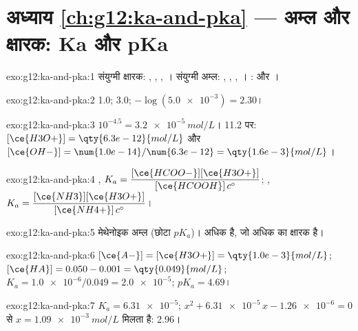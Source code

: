 \section*{अध्याय \ref{ch:g12:ka-and-pka} --- अम्ल और क्षारक: Ka और pKa}

\begin{solution}{exo:g12:ka-and-pka:1}
संयुग्मी क्षारक: , , , । संयुग्मी
अम्ल: , , , । : 
और ।
\end{solution}

\begin{solution}{exo:g12:ka-and-pka:2}
 1.0; 3.0; $-\log(\num{5.0e-3}) = 2.30$।
\end{solution}

\begin{solution}{exo:g12:ka-and-pka:3}
$10^{-4.5} = \qty{3.2e-5}{mol/L}$।  11.2 पर:
$[\ce{H3O+}] = \qty{6.3e-12}{mol/L}$ और
$[\ce{OH-}] = \num{1.0e-14}/\num{6.3e-12} = \qty{1.6e-3}{mol/L}$।
\end{solution}

\begin{solution}{exo:g12:ka-and-pka:4}
,
$K_a = \dfrac{[\ce{HCOO-}][\ce{H3O+}]}{[\ce{HCOOH}]\,c^\circ}$;
,
$K_a = \dfrac{[\ce{NH3}][\ce{H3O+}]}{[\ce{NH4+}]\,c^\circ}$।
\end{solution}

\begin{solution}{exo:g12:ka-and-pka:5}
मेथेनोइक अम्ल (छोटा $pK_a$)। अधिक   है, जो
अधिक  का क्षारक है।
\end{solution}

\begin{solution}{exo:g12:ka-and-pka:6}
$[\ce{A-}] = [\ce{H3O+}] = \qty{1.0e-3}{mol/L}$;
$[\ce{HA}] = 0.050 - 0.001 = \qty{0.049}{mol/L}$;
$K_a = \num{1.0e-6}/0.049 = \num{2.0e-5}$; $pK_a = 4.69$।
\end{solution}

\begin{solution}{exo:g12:ka-and-pka:7}
$K_a = \num{6.31e-5}$; $x^2 + \num{6.31e-5}\,x - \num{1.26e-6} = 0$ से
$x = \qty{1.09e-3}{mol/L}$ मिलता है:  2.96।
\end{solution}


